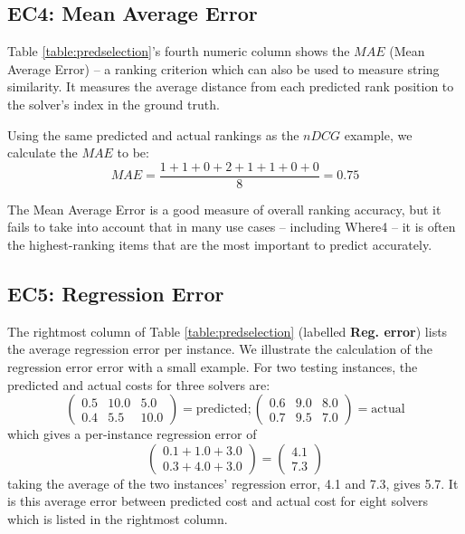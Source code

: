 \subsection{EC4: Mean Average Error}

Table \ref{table:predselection}'s fourth numeric column shows the 
$MAE$ (Mean Average Error) -- a ranking criterion which can also be used to measure string similarity. It measures the average distance from each predicted rank position to the solver's index in the ground truth.

Using the same predicted and actual rankings as the $nDCG$ example, we calculate the $MAE$ to be:
\[
	MAE = \frac{1 + 1 + 0 + 2 + 1 + 1 + 0 + 0}{8} = 0.75
\]

The Mean Average Error is a good measure of overall ranking accuracy, but it fails to take into account that in many use cases -- including \textsf{Where4} -- it is often the highest-ranking items that are the most important to predict accurately. 

\subsection{EC5: Regression Error}

The rightmost column of Table \ref{table:predselection} (labelled \textbf{Reg. error}) lists the average regression error per instance. 
We illustrate the calculation of the regression error error with a small example. For two testing instances, the predicted and actual costs for three solvers are: 
\[ \left( \begin{array}{ccc}
0.5 & 10.0 & 5.0 \\
0.4 & 5.5 & 10.0  \end{array} \right) = \text{predicted};
\left( \begin{array}{ccc}
0.6 & 9.0 & 8.0 \\
0.7 & 9.5 & 7.0 \end{array} \right) = \text{actual}\]
which gives a per-instance regression error of
\[ \left( \begin{array}{c}
0.1 + 1.0 + 3.0 \\
0.3 + 4.0 + 3.0
\end{array}  \right) = 
\left( \begin{array}{c}
4.1 \\
7.3
\end{array}  \right) \] 
taking the average of the two instances' regression error, 4.1 and 7.3, gives 5.7.
It is this average error between predicted cost and actual cost for eight solvers which is listed in the rightmost column.

